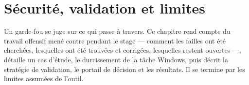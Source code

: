 \chapter{Sécurité, validation et limites}
\label{ch:securite}

Un garde-fou se juge sur ce qui passe à travers. Ce chapitre rend compte du travail offensif
mené contre \demo{} pendant le stage --- comment les failles ont été cherchées, lesquelles ont
été trouvées et corrigées, lesquelles restent ouvertes ---, détaille un cas d'étude, le
durcissement de la tâche Windows, puis décrit la stratégie de validation, le portail de
décision et les résultats. Il se termine par les limites assumées de l'outil.








